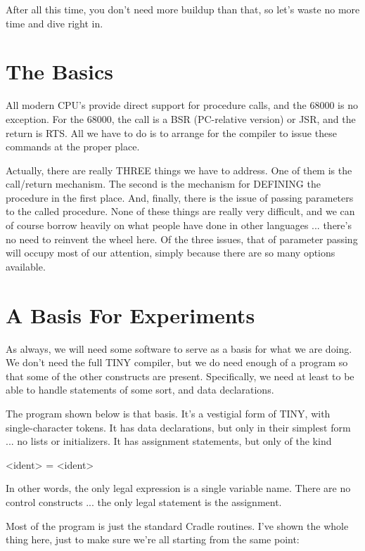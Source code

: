 \documentclass[float=false, crop=false]{standalone}
\begin{document}
After all this time, you don't need more buildup than that, so let's waste no
more time and dive right in.


\section{The Basics}

All modern CPU's provide direct support for procedure calls, and the 68000 is no
exception. For the 68000, the call is a BSR (PC-relative version) or JSR, and
the return is RTS. All we have to do is to arrange for the compiler to issue
these commands at the proper place.

Actually, there are really THREE things we have to address. One of them is the
call/return mechanism. The second is the mechanism for DEFINING the procedure in
the first place. And, finally, there is the issue of passing parameters to the
called procedure. None of these things are really very difficult, and we can of
course borrow heavily on what people have done in other languages ... there's no
need to reinvent the wheel here. Of the three issues, that of parameter passing
will occupy most of our attention, simply because there are so many options
available.


\section{A Basis For Experiments}

As always, we will need some software to serve as a basis for what we are doing.
We don't need the full TINY compiler, but we do need enough of a program so that
some of the other constructs are present. Specifically, we need at least to be
able to handle statements of some sort, and data declarations.

The program shown below is that basis. It's a vestigial form of TINY, with
single-character tokens. It has data declarations, but only in their simplest
form ... no lists or initializers. It has assignment statements, but only of the
kind

     <ident> = <ident>

In other words, the only legal expression is a single variable name. There are
no control constructs ... the only legal statement is the assignment.

Most of the program is just the standard Cradle routines. I've shown the whole
thing here, just to make sure we're all starting from the same point:
\end{document}

